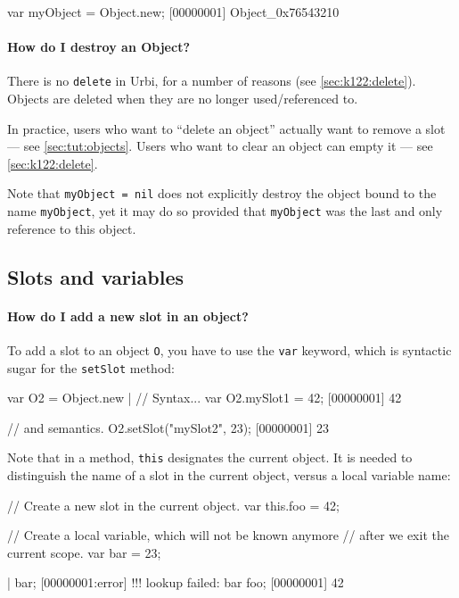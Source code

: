 \begin{urbiscript}
var myObject = Object.new;
[00000001] Object_0x76543210
\end{urbiscript}

\paragraph{How do I destroy an Object?}
There is no \lstinline{delete} in Urbi, for a number of reasons (see
\autoref{sec:k122:delete}).  Objects are deleted when they are no
longer used/referenced to.

In practice, users who want to ``delete an object'' actually want to
remove a slot --- see \autoref{sec:tut:objects}.  Users who want to
clear an object can empty it --- see \autoref{sec:k122:delete}.

Note that \lstinline{myObject = nil} does not explicitly destroy the
object bound to the name \lstinline{myObject}, yet it may do
so provided that \lstinline{myObject} was the last and only reference
to this object.

\subsection{Slots and variables}

\paragraph{How do I add a new slot in an object?}
To add a slot to an object \lstinline{O}, you have to use the
\lstinline{var} keyword, which is syntactic sugar for the
\lstinline{setSlot} method:

\begin{urbiscript}
var O2 = Object.new |
// Syntax...
var O2.mySlot1 = 42;
[00000001] 42

// and semantics.
O2.setSlot("mySlot2", 23);
[00000001] 23
\end{urbiscript}

Note that in a method, \lstinline{this} designates the current
object.  It is needed to distinguish the name of a slot in the current
object, versus a local variable name:

\begin{urbiscript}[firstnumber=last]
{
  // Create a new slot in the current object.
  var this.foo = 42;

  // Create a local variable, which will not be known anymore
  // after we exit the current scope.
  var bar = 23;
}|
bar;
[00000001:error] !!! lookup failed: bar
foo;
[00000001] 42
\end{urbiscript}


